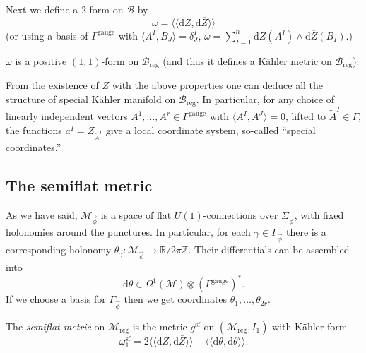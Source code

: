 \documentclass[12pt,letterpaper,reqno]{article}
\numberwithin{equation}{section}
\newcommand{\cB}{\ensuremath{\mathcal B}}
\newcommand{\cM}{\ensuremath{\mathcal M}}
\newcommand{\R}{\ensuremath{\mathbb R}}
\newcommand{\C}{\ensuremath{\mathbb C}}
\newcommand{\Z}{\ensuremath{\mathbb Z}}
\newcommand{\kahler}{K\"ahler\xspace}
\newcommand{\de}{\mathrm{d}}
\newcommand{\reg}{\mathrm{reg}}
\renewcommand{\sf}{\mathrm{sf}}
\newcommand{\gauge}{\mathrm{gauge}}
\newcommand{\IP}[1]{\langle#1\rangle}
\newcommand{\DIP}[1]{\langle\!\langle#1\rangle\!\rangle}
\newcommand{\vphi}{{\vec\phi}}
\newcommand{\ti}[1]{\textit{#1}}
\newcommand{\Sp}{\mathrm{Sp}}
\begin{document}
Next we define a 2-form on $\cB$ by
\begin{equation}
  \omega = \DIP{\de Z, \de \overline{Z}}
\end{equation}
(or using a basis of $\Gamma^\gauge$ with 
$\IP{A^I, B_J} = \delta^I_J$, 
$\omega = \sum_{I = 1}^{n} \de Z(A^I) \wedge \de \overline{Z}(B_I)$.)

\begin{prop} $\omega$ is a
positive $(1,1)$-form on $\cB_\reg$ (and thus it defines
a \kahler metric on $\cB_\reg$).
\end{prop}

From the existence of $Z$ with the above properties
one can deduce all the structure
of special \kahler manifold on $\cB_\reg$. In particular,
for any choice of linearly independent 
vectors $A^1, \dots, A^r \in \Gamma^\gauge$
with $\IP{A^I, A^J} = 0$, lifted to $\tilde A^I \in \Gamma$, 
the functions
$a^I = Z_{\tilde A^I}$ give a local coordinate
system, so-called ``special coordinates.''





\subsection{The semiflat metric}


As we have said, $\cM_\vphi$ is a space of flat $U(1)$-connections
over $\Sigma_\vphi$, with fixed holonomies around the
punctures.
In particular, for each $\gamma \in \Gamma_\vphi$ 
there is a corresponding
holonomy $\theta_\gamma: \cM_\vphi \to \R / 2 \pi \Z$.
Their differentials can be assembled into
\begin{equation}
  \de \theta \in \Omega^1(\cM) \otimes (\Gamma^\gauge)^*.
\end{equation}
If we choose a basis for $\Gamma_\vphi$ 
then we get coordinates $\theta_1, \dots, \theta_{2r}$.

\begin{defn}
The \ti{semiflat metric} on $\cM_\reg$ is the metric $g^\sf$ 
on $(\cM_\reg, I_1)$ with
\kahler form
\begin{equation}
  \omega^\sf_1 = 2 \DIP{\de Z, \de \bar{Z}} - \DIP{\de \theta, \de \theta}.
\end{equation}
\end{defn}
\end{document}
